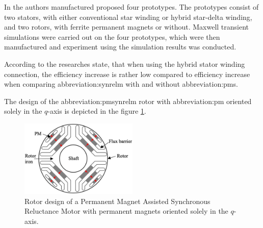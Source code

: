 \documentclass[a4paper, twoside, 11pt]{article}
\begin{document}
        In \cite{ibrahim-permanent-magnet-assisted-synchronous-reluctance-motor-employing-a-hybrid-star-delta-winding-for-high-speed-applicaitons} the authors manufactured proposed four prototypes. The prototypes consist of two stators, with either conventional star winding or hybrid star-delta winding, and two rotors, with ferrite permanent magnets or without. Maxwell transient simulations were carried out on the four prototypes, which were then manufactured and experiment using the simulation results was conducted.
\par
    According to \cite{ibrahim-permanent-magnet-assisted-synchronous-reluctance-motor-employing-a-hybrid-star-delta-winding-for-high-speed-applicaitons} the researches state, that when using the hybrid stator winding connection, the efficiency increase is rather low compared to efficiency increase when comparing \gls{abbreviation:synrelm} with and without \gls{abbreviation:pm}s.\par
    The design of the \gls{abbreviation:pmsynrelm} rotor with \gls{abbreviation:pm} oriented solely in the $q$-axis is depicted in the figure \ref{fig:pmsynrelm-rotor-magnets-q-axis}.
    
    \begin{figure}[htbp!]
            \centering
            \includegraphics[width=0.5\textwidth]{src/png/pmsynrelm-rotor-magnets-q-axis.png}
            \caption{Rotor design of a Permanent Magnet Assisted Synchronous Reluctance Motor with permanent magnets oriented solely in the $q$-axis. \cite{tavernini-design-and-optimisation-of-energy-efficient-pmsynrelm-for-electric-vehicles}}
            \label{fig:pmsynrelm-rotor-magnets-q-axis}
    \end{figure}
\end{document}
